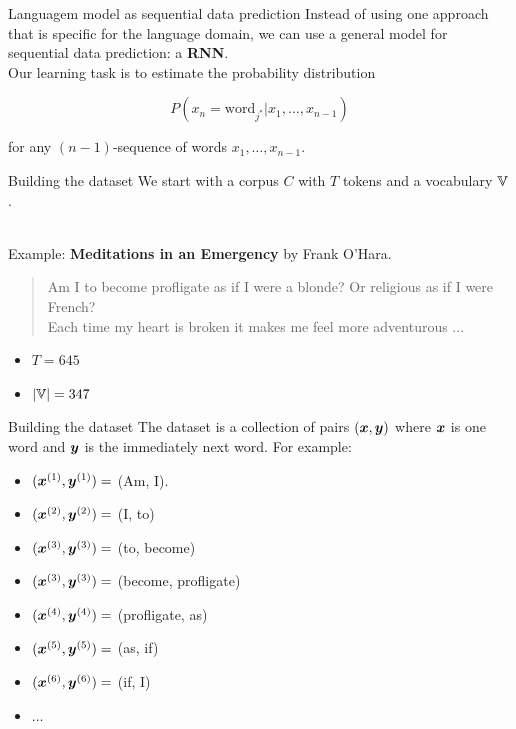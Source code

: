 \documentclass[10pt]{beamer}
\begin{document}
\begin{frame}{Languagem model as sequential data prediction}
Instead of using one approach that is specific for the language domain, we can use a general model for sequential data prediction: a \textbf{RNN}. \\

Our learning task is to estimate the probability distribution 

\[
P(x_{n} = \text{word}_{j^{*}} | x_{1}, \dots ,x_{n-1})
\]

for any $(n-1)$-sequence of words $x_{1}, \dots ,x_{n-1}$.
\end{frame}

\begin{frame}{Building the dataset}
We start with a corpus $C$ with $T$ tokens and a vocabulary $\mathbb{V}$.\\\

Example: \textbf{Meditations in an Emergency} by Frank O'Hara.\\

\begin{quote}
\alert{Am I to become profligate as if I were a blonde? Or religious as if I were French?\\
Each time my heart is broken it makes me feel more adventurous ... \\}
\end{quote}

\begin{itemize}
\item $T = 645$
\item $|\mathbb{V}| = 347$
\end{itemize}

\end{frame}

\begin{frame}{Building the dataset}
The dataset is a collection of pairs $(\bm{x},\bm{y})$ where $\bm{x}$ is one word and $\bm{y}$ is the immediately next word. For example:
\begin{itemize}
\item [] $(\bm{x}^{(1)}, \bm{y}^{(1)}) =$ (Am, I).
\item [] $(\bm{x}^{(2)}, \bm{y}^{(2)}) =$ (I, to)
\item [] $(\bm{x}^{(3)}, \bm{y}^{(3)}) =$ (to, become)
\item [] $(\bm{x}^{(3)}, \bm{y}^{(3)}) =$ (become, profligate)
\item [] $(\bm{x}^{(4)}, \bm{y}^{(4)}) =$ (profligate, as)
\item [] $(\bm{x}^{(5)}, \bm{y}^{(5)}) =$ (as, if)
\item [] $(\bm{x}^{(6)}, \bm{y}^{(6)}) =$ (if, I)
\item [] $\dots$
\end{itemize}
\end{frame}
\end{document}
